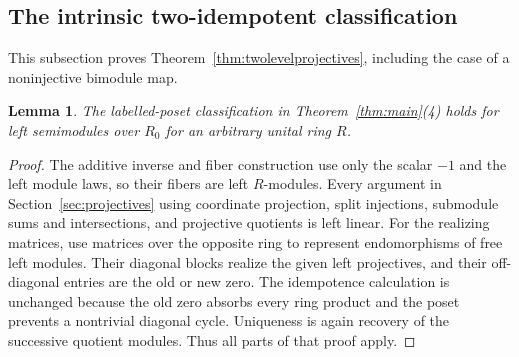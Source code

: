 \documentclass[11pt]{amsart}
\newtheorem{lemma}[theorem]{Lemma}
\theoremstyle{definition}
\theoremstyle{remark}
\begin{document}
\subsection{The intrinsic two-idempotent classification}
This subsection proves Theorem~\ref{thm:twolevelprojectives}, including the case of a noninjective bimodule map.

\begin{lemma}\label{lem:noncomm}
The labelled-poset classification in Theorem~\ref{thm:main}(4) holds for left semimodules over $R_0$ for an arbitrary unital ring $R$.
\end{lemma}
\begin{proof}
The additive inverse and fiber construction use only the scalar $-1$ and the left module laws, so their fibers are left $R$-modules. Every argument in Section~\ref{sec:projectives} using coordinate projection, split injections, submodule sums and intersections, and projective quotients is left linear. For the realizing matrices, use matrices over the opposite ring to represent endomorphisms of free left modules. Their diagonal blocks realize the given left projectives, and their off-diagonal entries are the old or new zero. The idempotence calculation is unchanged because the old zero absorbs every ring product and the poset prevents a nontrivial diagonal cycle. Uniqueness is again recovery of the successive quotient modules. Thus all parts of that proof apply.
\end{proof}
\end{document}
